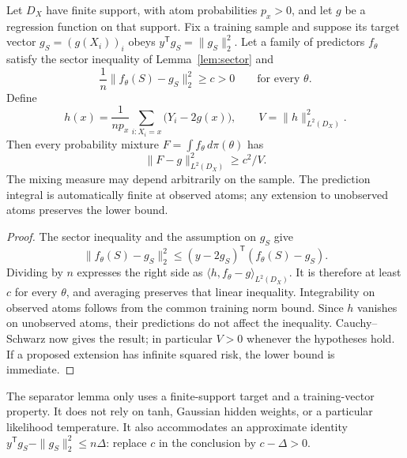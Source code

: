 \begin{lemma}
\label{lem:separator}
Let $D_X$ have finite support, with atom probabilities $p_x>0$, and let $g$ be a regression function on that support. Fix a training sample and suppose its target vector $g_S=(g(X_i))_i$ obeys $y^{\mathsf T}g_S=\|g_S\|_2^2$. Let a family of predictors $f_\theta$ satisfy the sector inequality of Lemma~\ref{lem:sector} and
\[
 \frac1n\|f_\theta(S)-g_S\|_2^2\ge c>0
 \qquad\text{for every }\theta.
\]
Define
\[
 h(x)=\frac1{np_x}\sum_{i:X_i=x}\bigl(Y_i-2g(x)\bigr),\qquad V=\|h\|_{L^2(D_X)}^2.
\]
Then every probability mixture $F=\int f_\theta\,d\pi(\theta)$ has
\[
 \|F-g\|_{L^2(D_X)}^2\ge c^2/V.
\]
The mixing measure may depend arbitrarily on the sample. The prediction integral is automatically finite at observed atoms; any extension to unobserved atoms preserves the lower bound.
\end{lemma}
\begin{proof}
The sector inequality and the assumption on $g_S$ give
\[
 \|f_\theta(S)-g_S\|_2^2
 \le(y-2g_S)^{\mathsf T}(f_\theta(S)-g_S).
\]
Dividing by $n$ expresses the right side as $\langle h,f_\theta-g\rangle_{L^2(D_X)}$. It is therefore at least $c$ for every $\theta$, and averaging preserves that linear inequality. Integrability on observed atoms follows from the common training norm bound. Since $h$ vanishes on unobserved atoms, their predictions do not affect the inequality. Cauchy--Schwarz now gives the result; in particular $V>0$ whenever the hypotheses hold. If a proposed extension has infinite squared risk, the lower bound is immediate.
\end{proof}

The separator lemma only uses a finite-support target and a training-vector property. It does not rely on tanh, Gaussian hidden weights, or a particular likelihood temperature. It also accommodates an approximate identity $y^{\mathsf T}g_S-\|g_S\|_2^2\le n\Delta$: replace $c$ in the conclusion by $c-\Delta>0$.

